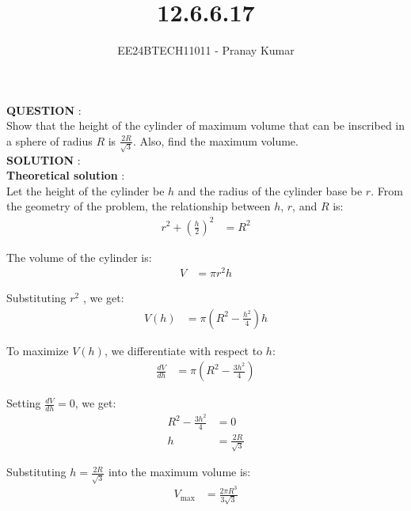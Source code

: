 \documentclass[journal]{IEEEtran}
\begin{document}

\vspace{3cm}

\title{12.6.6.17}
\author{EE24BTECH11011 - Pranay Kumar}
{\let\newpage\relax\maketitle}

\renewcommand{\thefigure}{\theenumi}
\renewcommand{\thetable}{\theenumi}
\setlength{\intextsep}{10pt} %

\renewcommand{\thetable}{\theenumi}

\textbf{QUESTION} : \\
Show that the height of the cylinder of maximum volume that can be inscribed in a sphere of radius $R$ is $\frac{2R}{\sqrt{3}}$. Also, find the maximum volume.\\

\textbf{SOLUTION} : \\

\textbf{Theoretical solution} : \\
Let the height of the cylinder be $h$ and the radius of the cylinder base be $r$. From the geometry of the problem, the relationship between $h$, $r$, and $R$ is:
\begin{align}
    r^2 + \left(\frac{h}{2}\right)^2 &= R^2 \label{eq:geometry}
\end{align}

The volume of the cylinder is:
\begin{align}
    V &= \pi r^2 h
\end{align}

Substituting $r^2$ , we get:
\begin{align}
    V(h) &= \pi \left(R^2 - \frac{h^2}{4}\right) h \label{eq:volume}
\end{align}

To maximize $V(h)$, we differentiate with respect to $h$:
\begin{align}
    \frac{dV}{dh} &= \pi \left( R^2 - \frac{3h^2}{4} \right) \label{eq:dv}
\end{align}

Setting $\frac{dV}{dh} = 0$, we get:
\begin{align}
    R^2 - \frac{3h^2}{4} &= 0 \\
    h &= \frac{2R}{\sqrt{3}}
\end{align}

Substituting $h = \frac{2R}{\sqrt{3}}$ into  the maximum volume is:
\begin{align}
    V_{\text{max}} &= \frac{2\pi R^3}{3\sqrt{3}}
\end{align}
\end{document}
